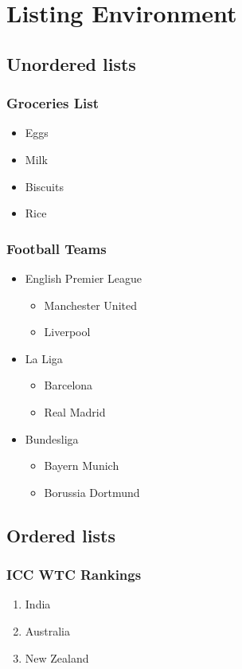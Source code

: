 \documentclass[6pt,a4paper]{report}
\begin{document}
\chapter{Listing Environment}
\begin{small}
\section*{Unordered lists}
\subsection*{Groceries List}
\begin{itemize}
	\item Eggs
	\item Milk
	\item Biscuits
	\item Rice
\end{itemize}	
\subsection*{Football Teams}
\begin{itemize}
	\item English Premier League
	\begin{itemize}
		\item Manchester United
		\item Liverpool
	\end{itemize}
	\item La Liga
	\begin{itemize}
		\item Barcelona
		\item Real Madrid
	\end{itemize}	
	\item Bundesliga
	\begin{itemize}
		\item Bayern Munich
		\item Borussia Dortmund
	\end{itemize}	
\end{itemize}
\section*{Ordered lists}
\subsection*{ICC WTC Rankings}
\begin{enumerate}
\item India
\item Australia
\item New Zealand
\end{enumerate}

\end{small}
\end{document}
